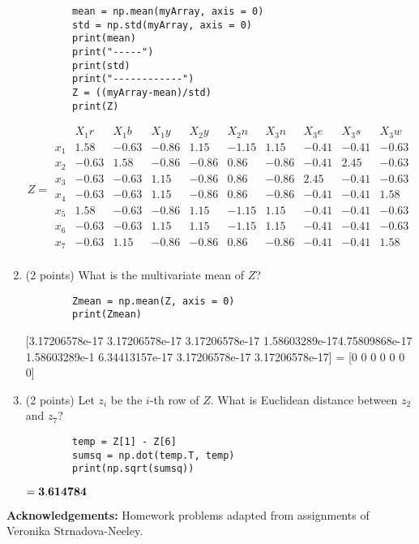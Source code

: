 \documentclass[11pt]{article}
\begin{document}
\begin{enumerate}
\begin{lstlisting}
        mean = np.mean(myArray, axis = 0)
        std = np.std(myArray, axis = 0)
        print(mean)
        print("-----")
        print(std)
        print("------------")
        Z = ((myArray-mean)/std)
        print(Z)
    \end{lstlisting}
$$      Z = \begin{matrix}
            & X_1r & X_1b & X_1y & X_2y & X_2n & X_3n & X_3e & X_3s & X_3w\\
        x_1 & 1.58   & -0.63    & -0.86    & 1.15     & -1.15   & 1.15    & -0.41    & -0.41    & -0.63\\
        x_2 & -0.63   & 1.58    & -0.86    & -0.86     & 0.86   & -0.86    & -0.41    & 2.45    & -0.63\\
        x_3 & -0.63   & -0.63    & 1.15    & -0.86     & 0.86   & -0.86    & 2.45    & -0.41    & -0.63\\
        x_4 & -0.63   & -0.63    & 1.15    & -0.86     & 0.86   & -0.86    & -0.41    & -0.41    & 1.58\\
        x_5 & 1.58   & -0.63    & -0.86    & 1.15     & -1.15   & 1.15    & -0.41    & -0.41    & -0.63\\
        x_6 & -0.63   & -0.63    & 1.15    & 1.15     & -1.15   & 1.15     & -0.41    & -0.41    & -0.63\\
        x_7 & -0.63   & 1.15    & -0.86    & -0.86     & 0.86   & -0.86    & -0.41    & -0.41    & 1.58\\
    \end{matrix}
$$
    \item (2 points) What is the multivariate mean of $Z$?
    \newline\begin{lstlisting}
        Zmean = np.mean(Z, axis = 0)
        print(Zmean)
    \end{lstlisting}
    [3.17206578e-17 3.17206578e-17 3.17206578e-17 1.58603289e-174.75809868e-17 1.58603289e-1 6.34413157e-17 3.17206578e-17 3.17206578e-17] = [0 0 0 0 0 0 0]
    \newpage
    \item (2 points) Let $z_i$ be the $i$-th row of $Z$.  What is Euclidean
    distance between $z_2$ and $z_7$?
    \newline\begin{lstlisting}
        temp = Z[1] - Z[6]
        sumsq = np.dot(temp.T, temp)
        print(np.sqrt(sumsq))
    \end{lstlisting}
    $=\bf 3.614784$
\end{enumerate}

{\bf Acknowledgements:} Homework problems adapted from assignments of
Veronika Strnadova-Neeley.
\end{document}
